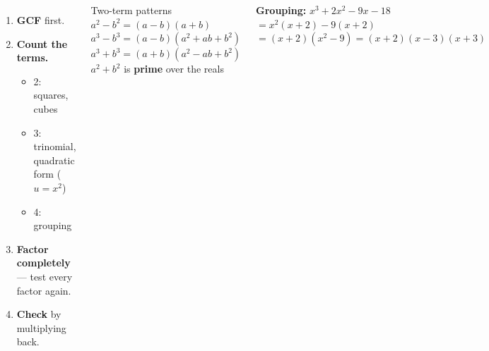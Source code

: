 \documentclass[aspectratio=169, 11pt]{beamer}
\begin{document}
\begin{frame}[t, plain]

  \begin{columns}[T]
      \begin{enumerate}\setlength{\itemsep}{6pt}
        \item \textbf{GCF} first.
        \item \textbf{Count the terms.}
          \begin{itemize}\setlength{\itemsep}{2pt}
            \item 2: squares, cubes
            \item 3: trinomial, quadratic form ($u = x^2$)
            \item 4: grouping
          \end{itemize}
        \item \textbf{Factor completely} --- test every factor again.
        \item \textbf{Check} by multiplying back.
      \end{enumerate}

      \begin{block}{Two-term patterns}
        $a^2 - b^2 = (a - b)(a + b)$\\[3pt]
        $a^3 - b^3 = (a - b)(a^2 + ab + b^2)$\\[3pt]
        $a^3 + b^3 = (a + b)(a^2 - ab + b^2)$\\[3pt]
        $a^2 + b^2$ is \textbf{prime} over the reals
      \end{block}

      \medskip
      \textbf{Grouping:} $x^3 + 2x^2 - 9x - 18$\\[2pt]
      $= x^2(x + 2) - 9(x + 2)$\\[2pt]
      $= (x + 2)(x^2 - 9) = (x + 2)(x - 3)(x + 3)$
  \end{columns}
\end{frame}
\end{document}

